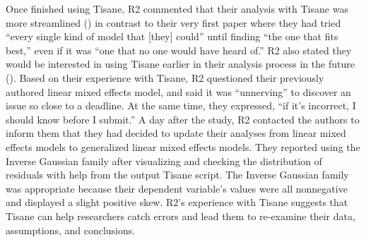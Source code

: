 \begin{comment}
Based on Tisane's reported normality test
results, they realized they could not assume their data were normally
distributed and that using a linear mixed effects model was inappropriate.
Although exploratory data analysis (EDA) would have led to the same insight, R2
said they had skipped EDA. %
As such, Tisane could help researchers %
familiarize themselves with data and return to EDA (\rqWorkflow, \rqCognitive).
Upon seeing the histogram of their data overlaid with simulated data, R2
initially picked the Poisson family and executed Tisane's output script, but R2
received a model fitting error because not all dependent variable values were
nonnegative integers. We have since implemented an additional check to ensure
that Poisson is a choice only when all dependent variable values are nonnegative
integers.
R2 explored the other family distributions and generated a new script using an
Inverse Gaussian family. The new output script issued an error due to the model
inference algorithm failing to converge. R2 made a note
to look into Inverse Gaussian distributions. %
\end{comment}

Once finished using Tisane, R2 commented that their analysis with Tisane was more streamlined (\rqWorkflow) in contrast
to their very first paper where they had tried ``every
single kind of model that [they] could'' until finding ``the one that fits best,''
even if it was ``one that no one would have heard of.''
R2 also stated they would be interested in using Tisane earlier
in their analysis process in the future (\rqFuture).
Based on their experience with Tisane, R2 questioned their previously authored linear mixed effects model, and said it was ``unnerving'' to
discover an issue so close to a deadline. At the same time, they expressed, ``if it's incorrect, I should know
before I submit.'' A day after the study, R2 contacted the authors to inform them that they had decided to
update their analyses from linear mixed effects models to generalized linear
mixed effects models. They reported using the Inverse
Gaussian family after visualizing and checking the distribution of residuals
with help from the output Tisane script. The Inverse Gaussian family was
appropriate because their dependent variable's values were all nonnegative and
displayed a slight positive skew.
R2's experience with Tisane suggests that Tisane can help
researchers catch errors and lead them to re-examine their data, assumptions,
and conclusions.

